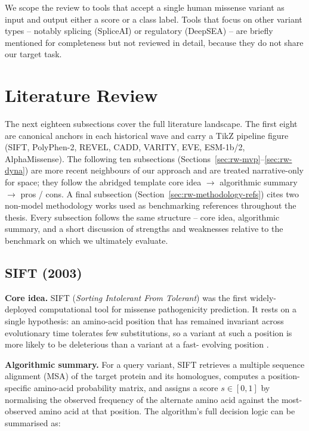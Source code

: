 \documentclass[11pt,a4paper,oneside]{report}
\begin{document}
We scope the review to tools that accept a single human
missense variant as input and output either a score or a
class label. Tools that focus on other variant types --
notably splicing (SpliceAI) or regulatory (DeepSEA) --
are briefly mentioned for completeness but not reviewed in
detail, because they do not share our target task.

\section{Literature Review}
\label{sec:rw-literature}

The next eighteen subsections cover the full literature landscape.
The first eight are canonical anchors in each historical wave and
carry a TikZ pipeline figure (SIFT, PolyPhen-2, REVEL, CADD, VARITY,
EVE, ESM-1b/2, AlphaMissense). The following ten subsections
(Sections~\ref{sec:rw-mvp}--\ref{sec:rw-dyna}) are more recent
neighbours of our approach and are treated narrative-only for space;
they follow the abridged template core idea $\to$ algorithmic
summary $\to$ pros / cons. A final subsection
(Section~\ref{sec:rw-methodology-refs}) cites two non-model
methodology works used as benchmarking references throughout the
thesis. Every subsection follows the same structure -- core idea,
algorithmic summary, and a short discussion of strengths and
weaknesses relative
to the benchmark on which we ultimately evaluate.

\subsection{SIFT (2003) \texorpdfstring{\citep{ng2003sift}}{(Ng and Henikoff, 2003)}}
\label{sec:rw-sift}

\textbf{Core idea.} SIFT (\emph{Sorting Intolerant From Tolerant})
was the first widely-deployed computational tool for
missense pathogenicity prediction. It rests on a single
hypothesis: an amino-acid position that has remained
invariant across evolutionary time tolerates few
substitutions, so a variant at such a position is more
likely to be deleterious than a variant at a fast-
evolving position \citep{ng2003sift}.

\textbf{Algorithmic summary.} For a query variant,
SIFT retrieves a multiple sequence alignment (MSA) of
the target protein and its homologues, computes a
position-specific amino-acid probability matrix, and
assigns a score $s \in [0, 1]$ by normalising the
observed frequency of the alternate amino acid against
the most-observed amino acid at that position. The
algorithm's full decision logic can be summarised as:
\end{document}
